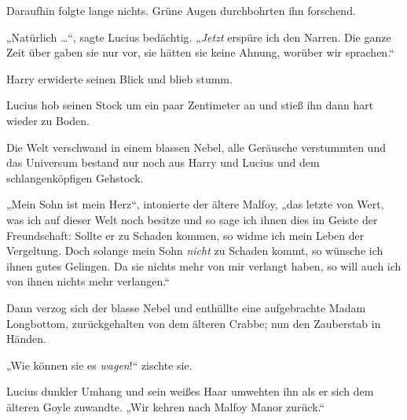 Daraufhin folgte lange nichts. Grüne Augen durchbohrten ihn forschend.

„Natürlich …“, sagte Lucius bedächtig.
„\emph{Jetzt} erspüre ich den Narren. Die ganze Zeit über gaben sie nur vor, sie hätten sie keine Ahnung, worüber wir sprachen.“

Harry erwiderte seinen Blick und blieb stumm.

Lucius hob seinen Stock um ein paar Zentimeter an und stieß ihn dann hart wieder zu Boden.

Die Welt verschwand in einem blassen Nebel, alle Geräusche verstummten und das Universum bestand nur noch aus Harry und Lucius und dem schlangenköpfigen Gehstock.

„Mein Sohn ist mein Herz“, intonierte der ältere Malfoy, „das letzte von Wert, was ich auf dieser Welt noch besitze und so sage ich ihnen dies im Geiste der Freundschaft: Sollte er zu Schaden kommen, so widme ich mein Leben der Vergeltung. Doch solange mein Sohn \emph{nicht} zu Schaden kommt, so wünsche ich ihnen gutes Gelingen. Da sie nichts mehr von mir verlangt haben, so will auch ich von ihnen nichts mehr verlangen.“

Dann verzog sich der blasse Nebel und enthüllte eine aufgebrachte Madam Longbottom, zurückgehalten von dem älteren Crabbe; nun den Zauberstab in Händen.

„Wie können sie es \emph{wagen}!“ zischte sie.

Lucius dunkler Umhang und sein weißes Haar umwehten ihn als er sich dem älteren Goyle zuwandte.
„Wir kehren nach Malfoy Manor zurück.“

